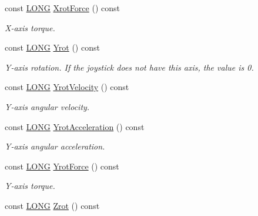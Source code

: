 \begin{DoxyCompactItemize}
const \hyperlink{_joypad_8h_a2a3e0cda5f1249bef6db47c5eb8e3813}{L\+O\+NG} \hyperlink{class_c_joypad_a1698ee36211a10513530a5bf13558eb9}{Xrot\+Force} () const
\begin{DoxyCompactList}\small\item\em X-\/axis torque. \end{DoxyCompactList}\item 
\mbox{\label{class_c_joypad_aa86c6d28e48661188b7e9dd605270ffa}} 
const \hyperlink{_joypad_8h_a2a3e0cda5f1249bef6db47c5eb8e3813}{L\+O\+NG} \hyperlink{class_c_joypad_aa86c6d28e48661188b7e9dd605270ffa}{Yrot} () const
\begin{DoxyCompactList}\small\item\em Y-\/axis rotation. If the joystick does not have this axis, the value is 0. \end{DoxyCompactList}\item 
\mbox{\label{class_c_joypad_a6d65541f2c9059e1c90219bcd3ab8cc4}} 
const \hyperlink{_joypad_8h_a2a3e0cda5f1249bef6db47c5eb8e3813}{L\+O\+NG} \hyperlink{class_c_joypad_a6d65541f2c9059e1c90219bcd3ab8cc4}{Yrot\+Velocity} () const
\begin{DoxyCompactList}\small\item\em Y-\/axis angular velocity. \end{DoxyCompactList}\item 
\mbox{\label{class_c_joypad_abbba1a190c7b6ef552e8dba84969c7fe}} 
const \hyperlink{_joypad_8h_a2a3e0cda5f1249bef6db47c5eb8e3813}{L\+O\+NG} \hyperlink{class_c_joypad_abbba1a190c7b6ef552e8dba84969c7fe}{Yrot\+Acceleration} () const
\begin{DoxyCompactList}\small\item\em Y-\/axis angular acceleration. \end{DoxyCompactList}\item 
\mbox{\label{class_c_joypad_a769f8470b70666c56444d8eed5ecac10}} 
const \hyperlink{_joypad_8h_a2a3e0cda5f1249bef6db47c5eb8e3813}{L\+O\+NG} \hyperlink{class_c_joypad_a769f8470b70666c56444d8eed5ecac10}{Yrot\+Force} () const
\begin{DoxyCompactList}\small\item\em Y-\/axis torque. \end{DoxyCompactList}\item 
const \hyperlink{_joypad_8h_a2a3e0cda5f1249bef6db47c5eb8e3813}{L\+O\+NG} \hyperlink{class_c_joypad_a4cd374af62d1380af4f92156503330a7}{Zrot} () const

\end{DoxyCompactItemize}
